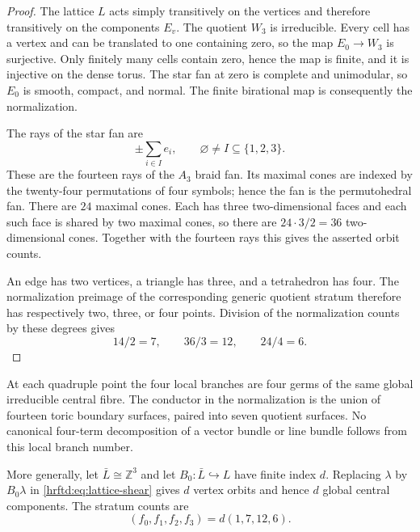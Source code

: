 \begin{proof}
The lattice \(L\) acts simply transitively on the vertices and therefore
transitively on the components \(E_v\).  The quotient \(W_3\) is irreducible.
Every cell has a vertex and can be translated to one containing zero, so the
map \(E_0\to W_3\) is surjective.  Only finitely many cells contain zero,
hence the map is finite, and it is injective on the dense torus.  The star
fan at zero is complete and unimodular, so \(E_0\) is smooth, compact, and
normal.  The finite birational map is consequently the normalization.

The rays of the star fan are
\[
 \pm\sum_{i\in I}e_i,
 \qquad
 \varnothing\ne I\subseteq\{1,2,3\}.
\]
These are the fourteen rays of the \(A_3\) braid fan.  Its maximal cones are
indexed by the twenty-four permutations of four symbols; hence the fan is the
permutohedral fan.  There are \(24\) maximal cones.  Each has three
two-dimensional faces and each such face is shared by two maximal cones, so
there are \(24\cdot3/2=36\) two-dimensional cones.  Together with the
fourteen rays this gives the asserted orbit counts.

An edge has two vertices, a triangle has three, and a tetrahedron has four.
The normalization preimage of the corresponding generic quotient stratum
therefore has respectively two, three, or four points.  Division of the
normalization counts by these degrees gives
\[
 14/2=7,\qquad 36/3=12,\qquad 24/4=6.
\]
\end{proof}

\begin{remark}
\label{hrftd:rem:local-not-global}
At each quadruple point the four local branches are four germs of the same
global irreducible central fibre.  The conductor in the normalization is the
union of fourteen toric boundary surfaces, paired into seven quotient
surfaces.  No canonical four-term decomposition of a vector bundle or line
bundle follows from this local branch number.
\end{remark}

More generally, let \(\bar L\cong\mathbb Z^3\) and let
\(B_0:\bar L\hookrightarrow L\) have finite index \(d\).  Replacing
\(\lambda\) by \(B_0\lambda\) in \eqref{hrftd:eq:lattice-shear} gives
\(d\) vertex orbits and hence \(d\) global central components.  The stratum
counts are
\begin{equation}
 (f_0,f_1,f_2,f_3)=d(1,7,12,6).
 \label{hrftd:eq:index-d-counts}
\end{equation}


